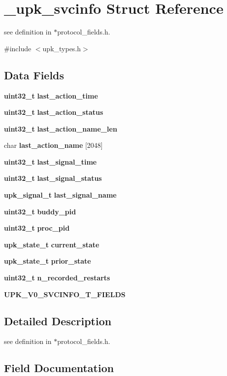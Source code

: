\section{\_\-upk\_\-svcinfo Struct Reference}
\label{struct__upk__svcinfo}


see definition in $\ast$protocol\_\-fields.h.  




{\ttfamily \#include $<$upk\_\-types.h$>$}

\subsection*{Data Fields}
\begin{DoxyCompactItemize}
\item 
{\bf uint32\_\-t} {\bf last\_\-action\_\-time}
\item 
{\bf uint32\_\-t} {\bf last\_\-action\_\-status}
\item 
{\bf uint32\_\-t} {\bf last\_\-action\_\-name\_\-len}
\item 
char {\bf last\_\-action\_\-name} [2048]
\item 
{\bf uint32\_\-t} {\bf last\_\-signal\_\-time}
\item 
{\bf uint32\_\-t} {\bf last\_\-signal\_\-status}
\item 
{\bf upk\_\-signal\_\-t} {\bf last\_\-signal\_\-name}
\item 
{\bf uint32\_\-t} {\bf buddy\_\-pid}
\item 
{\bf uint32\_\-t} {\bf proc\_\-pid}
\item 
{\bf upk\_\-state\_\-t} {\bf current\_\-state}
\item 
{\bf upk\_\-state\_\-t} {\bf prior\_\-state}
\item 
{\bf uint32\_\-t} {\bf n\_\-recorded\_\-restarts}
\item 
{\bf UPK\_\-V0\_\-SVCINFO\_\-T\_\-FIELDS}
\end{DoxyCompactItemize}


\subsection{Detailed Description}
see definition in $\ast$protocol\_\-fields.h. 

\subsection{Field Documentation}
